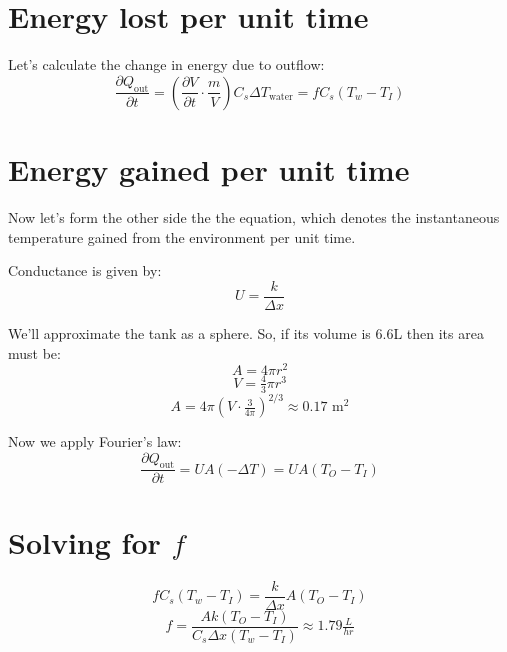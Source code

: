 \documentclass[12pt]{article}
\newcommand{\pderiv}[2]{\frac{\partial #1}{\partial #2}}
\begin{document}
\section*{Energy lost per unit time}
Let's calculate the change in energy due to outflow:
\[ \pderiv{Q_\text{out}}{t} = \left(\pderiv{V}{t} \cdot \frac{m}{V}\right) C_s \Delta T_\text{water} = f C_s (T_w - T_I) \]

\section*{Energy gained per unit time}
Now let's form the other side the the equation, which denotes the instantaneous temperature gained from the environment per unit time. 

Conductance is given by:
\[ U = \frac{k}{\Delta x} \]

We'll approximate the tank as a sphere. So, if its volume is 6.6L then its area must be:
\[ A = 4\pi r^2 \]
\[ V = \tfrac{4}{3}\pi r^3 \]
\[ A = 4\pi(V \cdot \tfrac{3}{4\pi})^{2/3} \approx 0.17 \text{ m}^2 \]

Now we apply Fourier's law:
\[ \pderiv{Q_\text{out}}{t} = UA(-\Delta T) = UA(T_O - T_I) \]

\section*{Solving for $f$}
\[ f C_s (T_w - T_I) = \frac{k}{\Delta x} A (T_O - T_I) \]
\[ f = \frac{Ak (T_O - T_I)}{C_s \Delta x (T_w - T_I)} \approx 1.79 \tfrac{L}{hr} \]






\end{document}
